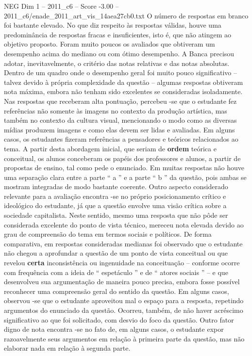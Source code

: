 \begin{textsample}{NEG Dim 1 – 2011\_c6 – Score -3.00 – 2011\_c6/enade\_2011\_art\_vis\_14aea27cb0.txt}
O número de respostas em branco foi bastante elevado.
No que diz respeito às respostas válidas, houve uma predominância de respostas fracas e insuficientes, isto é, que não atingem ao objetivo proposto.
Foram muito poucos os avaliados que obtiveram um desempenho acima do mediano ou com ótimo desempenho.
A Banca precisou adotar, inevitavelmente, o critério das notas relativas e das notas absolutas.
Dentro de um quadro onde o desempenho geral foi muito pouco significativo – talvez devido à própria complexidade da questão – algumas respostas obtiveram nota máxima, embora não tenham sido excelentes se consideradas isoladamente.
Nas respostas que receberam alta pontuação, percebeu -se que o estudante fez referências não somente às imagens no contexto da produção artística, mas também no contexto da cultura visual, mencionando o modo como as diversas mídias produzem imagens e como elas devem ser lidas e avaliadas.
Em alguns casos, os estudantes fizeram referências a pensadores e teóricos relacionados ao tema.
A partir desta abordagem inicial, que seriam de \textbf{ordem} teórica e conceitual, os alunos conceberam os papéis dos professores e alunos, a partir de propostas de ensino, tal como pede o enunciado.
Em muitas respostas não houve uma separação clara entre a parte “ a ” e a parte “ b ” da questão, pois ambas se mostram integradas de modo bastante coerente.
Outro aspecto considerado relevante para a avaliação encontra -se no próprio posicionamento crítico e ideológico do estudante, já que a questão envolve uma visão crítica sobre a sociedade capitalista.
Neste sentido, mesmo uma resposta que não pôde ser considerada excelente do ponto de vista técnico, mereceu nota elevada devido ao grau de compreensão do tema em termos sociais e políticos.
De forma comparativa, em respostas consideradas medianas foi observado que o estudante não chegou a aprofundar a questão de um ponto de vista conceitual ou que revelou \textbf{certa} inconsistência ou ingenuidade na conceituação – conforme ocorre com frequência com a ideia de “ espetáculo ” e de “ atores sociais ” – e que desenvolveu sua argumentação de maneira pouco precisa, embora fosse possível reconhecer uma compreensão geral do sentido da questão.
Em alguns casos, observou -se que o estudante aproveitou mal o espaço para a resposta, repetindo argumentos do enunciado da questão.
Ocorreu, também, de não haver acréscimo significativo ao que foi solicitado, com desvio do foco da questão.
Outro fator digno de nota encontra -se no fato de, em alguns casos, o estudante expor razoavelmente seus argumentos em relação à primeira parte da questão, mas não elaborar nada em relação à segunda parte.

\end{textsample}
